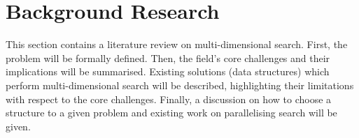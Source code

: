 \section{Background Research}
\label{sec:background-research}

This section contains a literature review on multi-dimensional search. First, the problem will be formally defined. Then, the field's core challenges and their implications will be summarised. Existing solutions (data structures) which perform multi-dimensional search will be described, highlighting their limitations with respect to the core challenges. Finally, a discussion on how to choose a structure to a given problem and existing work on parallelising search will be given.







